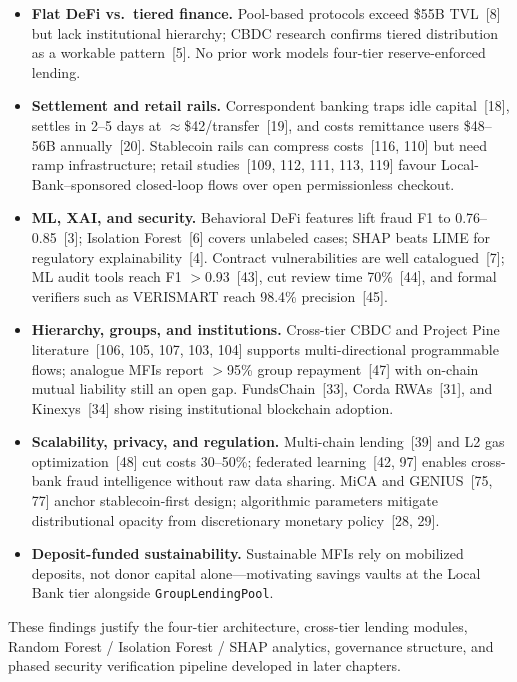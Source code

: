 \documentclass[12pt, a4paper]{report}
\begin{document}
\begin{itemize}[noitemsep]
\item \textbf{Flat DeFi vs.\ tiered finance.} Pool-based protocols exceed \$55B TVL~[8] but lack institutional hierarchy; CBDC research confirms tiered distribution as a workable pattern~[5]. No prior work models four-tier reserve-enforced lending.
\item \textbf{Settlement and retail rails.} Correspondent banking traps idle capital~[18], settles in 2--5 days at $\approx$\$42/transfer~[19], and costs remittance users \$48--56B annually~[20]. Stablecoin rails can compress costs~[116, 110] but need ramp infrastructure; retail studies~[109, 112, 111, 113, 119] favour Local-Bank--sponsored closed-loop flows over open permissionless checkout.
\item \textbf{ML, XAI, and security.} Behavioral DeFi features lift fraud F1 to 0.76--0.85~[3]; Isolation Forest~[6] covers unlabeled cases; SHAP beats LIME for regulatory explainability~[4]. Contract vulnerabilities are well catalogued~[7]; ML audit tools reach F1 $>$0.93~[43], cut review time 70\%~[44], and formal verifiers such as VERISMART reach 98.4\% precision~[45].
\item \textbf{Hierarchy, groups, and institutions.} Cross-tier CBDC and Project Pine literature~[106, 105, 107, 103, 104] supports multi-directional programmable flows; analogue MFIs report $>$95\% group repayment~[47] with on-chain mutual liability still an open gap. FundsChain~[33], Corda RWAs~[31], and Kinexys~[34] show rising institutional blockchain adoption.
\item \textbf{Scalability, privacy, and regulation.} Multi-chain lending~[39] and L2 gas optimization~[48] cut costs 30--50\%; federated learning~[42, 97] enables cross-bank fraud intelligence without raw data sharing. MiCA and GENIUS~[75, 77] anchor stablecoin-first design; algorithmic parameters mitigate distributional opacity from discretionary monetary policy~[28, 29].
\item \textbf{Deposit-funded sustainability.} Sustainable MFIs rely on mobilized deposits, not donor capital alone---motivating savings vaults at the Local Bank tier alongside \texttt{GroupLendingPool}.
\end{itemize}

These findings justify the four-tier architecture, cross-tier lending modules, Random Forest / Isolation Forest / SHAP analytics, governance structure, and phased security verification pipeline developed in later chapters.
\end{document}
